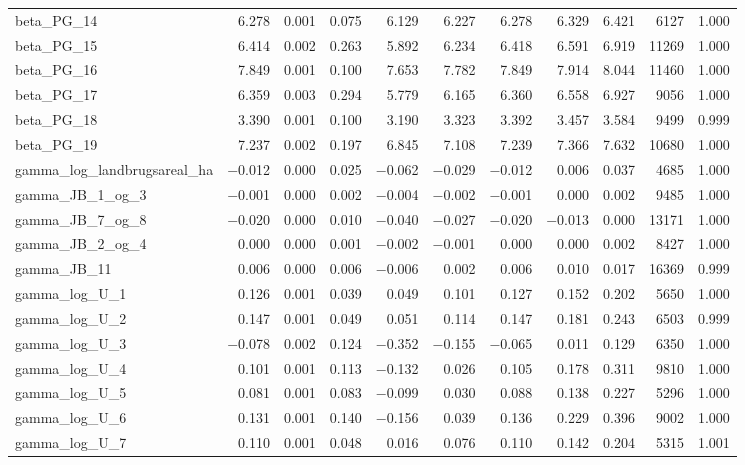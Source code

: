 \documentclass[12pt]{article}
\begin{document}
\begin{longtable}{lrrrrrrrrrr}
beta\_PG\_14 & 6.278 & 0.001 & 0.075 & 6.129 & 6.227 & 6.278 & 6.329 & 6.421 &  6127 & 1.000 \\
beta\_PG\_15 & 6.414 & 0.002 & 0.263 & 5.892 & 6.234 & 6.418 & 6.591 & 6.919 & 11269 & 1.000 \\
beta\_PG\_16 & 7.849 & 0.001 & 0.100 & 7.653 & 7.782 & 7.849 & 7.914 & 8.044 & 11460 & 1.000 \\
beta\_PG\_17 & 6.359 & 0.003 & 0.294 & 5.779 & 6.165 & 6.360 & 6.558 & 6.927 &  9056 & 1.000 \\
beta\_PG\_18 & 3.390 & 0.001 & 0.100 & 3.190 & 3.323 & 3.392 & 3.457 & 3.584 &  9499 & 0.999 \\
beta\_PG\_19 & 7.237 & 0.002 & 0.197 & 6.845 & 7.108 & 7.239 & 7.366 & 7.632 & 10680 & 1.000 \\
\addlinespace
gamma\_log\_landbrugsareal\_ha & $-$0.012 & 0.000 & 0.025 & $-$0.062 & $-$0.029 & $-$0.012 &  0.006 &  0.037 & 4685 & 1.000 \\
gamma\_JB\_1\_og\_3  & $-$0.001 & 0.000 & 0.002 & $-$0.004 & $-$0.002 & $-$0.001 &  0.000 &  0.002 &  9485 & 1.000 \\
gamma\_JB\_7\_og\_8  & $-$0.020 & 0.000 & 0.010 & $-$0.040 & $-$0.027 & $-$0.020 & $-$0.013 &  0.000 & 13171 & 1.000 \\
gamma\_JB\_2\_og\_4  &  0.000 & 0.000 & 0.001 & $-$0.002 & $-$0.001 &  0.000 &  0.000 &  0.002 &  8427 & 1.000 \\
gamma\_JB\_11        &  0.006 & 0.000 & 0.006 & $-$0.006 &  0.002 &  0.006 &  0.010 &  0.017 & 16369 & 0.999 \\
gamma\_log\_U\_1  &  0.126 & 0.001 & 0.039 &  0.049 &  0.101 &  0.127 &  0.152 &  0.202 &  5650 & 1.000 \\
gamma\_log\_U\_2  &  0.147 & 0.001 & 0.049 &  0.051 &  0.114 &  0.147 &  0.181 &  0.243 &  6503 & 0.999 \\
gamma\_log\_U\_3  & $-$0.078 & 0.002 & 0.124 & $-$0.352 & $-$0.155 & $-$0.065 &  0.011 &  0.129 &  6350 & 1.000 \\
gamma\_log\_U\_4  &  0.101 & 0.001 & 0.113 & $-$0.132 &  0.026 &  0.105 &  0.178 &  0.311 &  9810 & 1.000 \\
gamma\_log\_U\_5  &  0.081 & 0.001 & 0.083 & $-$0.099 &  0.030 &  0.088 &  0.138 &  0.227 &  5296 & 1.000 \\
gamma\_log\_U\_6  &  0.131 & 0.001 & 0.140 & $-$0.156 &  0.039 &  0.136 &  0.229 &  0.396 &  9002 & 1.000 \\
gamma\_log\_U\_7  &  0.110 & 0.001 & 0.048 &  0.016 &  0.076 &  0.110 &  0.142 &  0.204 &  5315 & 1.001 \\

\end{longtable}
\end{document}
